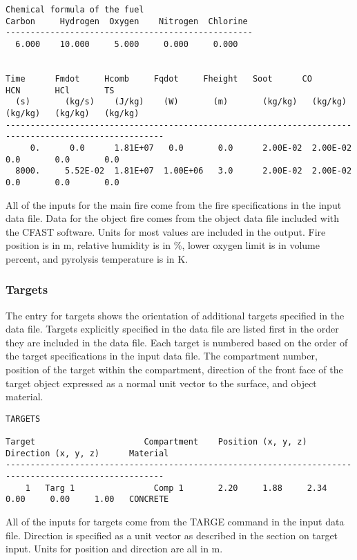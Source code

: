 \begin{lstlisting}[basicstyle=\tiny]
Chemical formula of the fuel
Carbon     Hydrogen  Oxygen    Nitrogen  Chlorine
--------------------------------------------------
  6.000    10.000     5.000     0.000     0.000


Time      Fmdot     Hcomb     Fqdot     Fheight   Soot      CO        HCN       HCl       TS
  (s)       (kg/s)    (J/kg)    (W)       (m)       (kg/kg)   (kg/kg)   (kg/kg)   (kg/kg)   (kg/kg)
------------------------------------------------------------------------------------------------------
     0.      0.0      1.81E+07   0.0       0.0      2.00E-02  2.00E-02   0.0       0.0       0.0
  8000.     5.52E-02  1.81E+07  1.00E+06   3.0      2.00E-02  2.00E-02   0.0       0.0       0.0
\end{lstlisting}
All of the inputs for the main fire come from the fire specifications in the input data file. Data for the object fire comes from the object data file included with the CFAST software. Units for most values are included in the output.  Fire position is in m, relative humidity is in \%, lower oxygen limit is in volume percent, and pyrolysis temperature is in K.


\subsubsection{Targets}

The entry for targets shows the orientation of additional targets specified in the data file. Targets explicitly specified in the data file are listed first in the order they are included in the data file.  Each target is numbered based on the order of the target specifications in the input data file.  The compartment number, position of the target within the compartment, direction of the front face of the target object expressed as a normal unit vector to the surface, and object material.

\begin{lstlisting}[basicstyle=\tiny]
TARGETS

Target                      Compartment    Position (x, y, z)         Direction (x, y, z)      Material
------------------------------------------------------------------------------------------------------
    1   Targ 1                Comp 1       2.20     1.88     2.34     0.00     0.00     1.00   CONCRETE
\end{lstlisting}
All of the inputs for targets come from the TARGE command in the input data file. Direction is specified as a unit vector as described in the section on target input. Units for position and direction are all in m.

